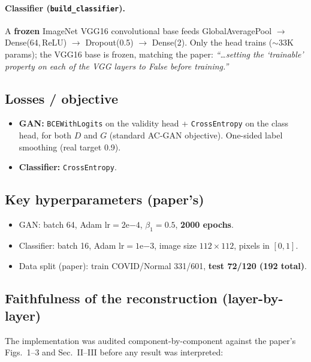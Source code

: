 \documentclass[11pt]{article}
\newcommand{\code}[1]{\texttt{#1}}
\begin{document}
\paragraph{Classifier (\code{build\_classifier}).} A \textbf{frozen} ImageNet
VGG16 convolutional base feeds GlobalAveragePool $\to$ Dense(64,\,ReLU) $\to$
Dropout(0.5) $\to$ Dense(2). Only the head trains ($\sim$33K params); the VGG16
base is frozen, matching the paper: \emph{``\ldots setting the `trainable'
property on each of the VGG layers to False before training.''}

\subsection{Losses / objective}
\begin{itemize}[nosep,leftmargin=1.4em]
  \item \textbf{GAN:} \code{BCEWithLogits} on the validity head +
        \code{CrossEntropy} on the class head, for both $D$ and $G$ (standard
        AC-GAN objective). One-sided label smoothing (real target 0.9).
  \item \textbf{Classifier:} \code{CrossEntropy}.
\end{itemize}

\subsection{Key hyperparameters (paper's)}
\begin{itemize}[nosep,leftmargin=1.4em]
  \item GAN: batch 64, Adam $\text{lr}=2\mathrm{e}{-4}$, $\beta_1=0.5$,
        \textbf{2000 epochs}.
  \item Classifier: batch 16, Adam $\text{lr}=1\mathrm{e}{-3}$, image size
        $112{\times}112$, pixels in $[0,1]$.
  \item Data split (paper): train COVID/Normal 331/601, \textbf{test 72/120
        (192 total)}.
\end{itemize}

\subsection{Faithfulness of the reconstruction (layer-by-layer)}
\label{sec:faithful}
The implementation was audited component-by-component against the paper's
Figs.~1--3 and Sec.~II--III before any result was interpreted:
\end{document}
